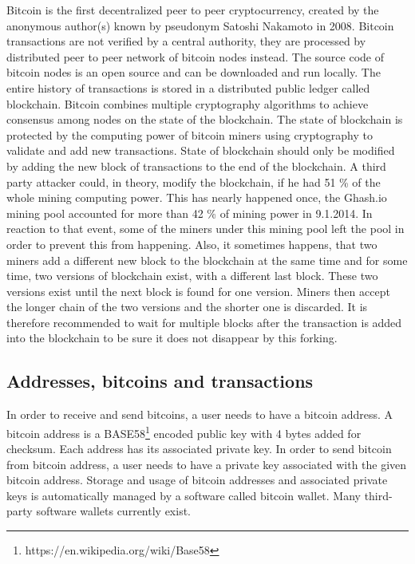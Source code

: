 \documentclass[
  digital, %
  table,   %
  lof,     %
  lot,     %
  oneside
]{fithesis3}
\begin{document}
Bitcoin \cite{nakamoto2008bitcoin} is the first decentralized peer to peer cryptocurrency,
created by the anonymous author(s) known by pseudonym Satoshi Nakamoto in 2008.
Bitcoin transactions are not verified by a central authority, they are processed by distributed peer to peer network of bitcoin nodes instead. 
The source code of bitcoin nodes is an open source and can be downloaded and run locally. 
The entire history of transactions is stored in a distributed public ledger called blockchain.
Bitcoin combines multiple cryptography algorithms to achieve consensus among nodes
on the state of the blockchain.
The state of blockchain is protected by the computing power of bitcoin miners
using cryptography to validate and add new transactions.
State of blockchain should only be modified by adding the new block of transactions to the end of the blockchain.
A third party attacker could, in theory, modify the blockchain, if he had 51 \% of the whole mining computing power.
This has nearly happened once, the Ghash.io mining pool accounted for more than 42 \% of mining power in 9.1.2014. In reaction to that event, some of the miners under this mining pool left the pool in order to prevent this from happening.
Also, it sometimes happens, that two miners add a different new block to the blockchain at the same time
and for some time, two versions of blockchain exist, with a different last block.
These two versions exist until the next block is found for one version.
Miners then accept the longer chain of the two versions and the shorter one is discarded.
It is therefore recommended to wait for multiple blocks after the transaction is added into the blockchain
to be sure it does not disappear by this forking.
 
\subsection{Addresses, bitcoins and transactions}
\label{btcadd}
In order to receive and send bitcoins, a user needs to have a bitcoin address.
A bitcoin address is a BASE58\footnote{https://en.wikipedia.org/wiki/Base58}
encoded public key with 4 bytes added for checksum.
Each address has its associated private key.
In order to send bitcoin from bitcoin address,
a user needs to have a private key associated with the given bitcoin address.
Storage and usage of bitcoin addresses and associated private keys is automatically managed
by a software called bitcoin wallet. Many third-party software wallets currently exist.
\end{document}
